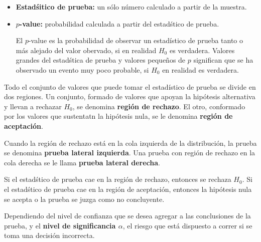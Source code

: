 \begin{itemize}
\item \textbf{Estad\'sitico de prueba:} un s\'olo n\'umero calculado a partir de la muestra.

\item \textbf{$p$-value:} probabilidad calculada a partir del estad\'stico de prueba.
\begin{Def}
El $p$-value es la probabilidad de observar un estad\'istico de prueba tanto o m\'as alejado del valor obervado, si en realidad $H_{0}$ es verdadera.\medskip
Valores grandes del estad\'stica de prueba  y valores peque\~nos de $p$ significan que se ha observado un evento muy poco probable, si $H_{0}$ en realidad es verdadera.
\end{Def}

\end{itemize}






Todo el conjunto de valores que puede tomar el estad\'istico de prueba se divide en dos regiones. Un conjunto, formado de valores que apoyan la hip\'otesis alternativa y llevan a rechazar $H_{0}$, se denomina \textbf{regi\'on de rechazo}. El otro, conformado por los valores que sustentatn la hip\'otesis nula, se le denomina \textbf{regi\'on de aceptaci\'on}.\medskip

Cuando la regi\'on de rechazo est\'a en la cola izquierda de la distribuci\'on, la  prueba se denomina \textbf{prueba lateral izquierda}. Una prueba con regi\'on de rechazo en la cola derecha se le llama \textbf{prueba lateral derecha}.


Si el estad\'stico de prueba cae en la regi\'on de rechazo, entonces se rechaza $H_{0}$. Si el estad\'stico de prueba cae en la regi\'on de aceptaci\'on, entonces la hip\'otesis nula se acepta o la prueba se juzga como no concluyente.\medskip






Dependiendo del nivel de confianza que se desea agregar a las conclusiones de la prueba, y el \textbf{nivel de significancia $\alpha$}, el riesgo que est\'a dispuesto a correr si se toma una decisi\'on incorrecta.






